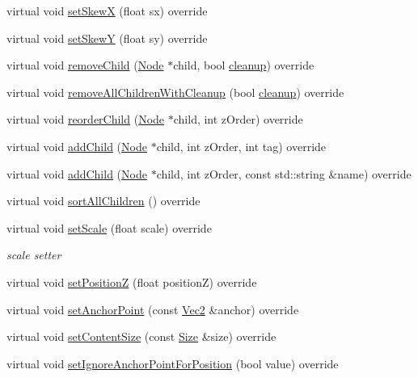 \begin{Indent}
\begin{DoxyCompactItemize}
\item 
virtual void \hyperlink{classSprite_a975b779e48841943ebbe5147331fc8c2}{set\+SkewX} (float sx) override
\item 
virtual void \hyperlink{classSprite_a5472345454102a7682c929b974573879}{set\+SkewY} (float sy) override
\item 
virtual void \hyperlink{classSprite_a84cbb6f523e114e8d5c5767ec7796111}{remove\+Child} (\hyperlink{classNode}{Node} $\ast$child, bool \hyperlink{classNode_aa2de84c6cdeec9cd647d236c30ee0567}{cleanup}) override
\item 
virtual void \hyperlink{classSprite_aaaf5e178d5fd88574b9803fe3fab94fa}{remove\+All\+Children\+With\+Cleanup} (bool \hyperlink{classNode_aa2de84c6cdeec9cd647d236c30ee0567}{cleanup}) override
\item 
virtual void \hyperlink{classSprite_a1b21c65760769e17477ae02ce75adf9f}{reorder\+Child} (\hyperlink{classNode}{Node} $\ast$child, int z\+Order) override
\item 
virtual void \hyperlink{classSprite_af91733127ca0e09dd0a36c78c62ff099}{add\+Child} (\hyperlink{classNode}{Node} $\ast$child, int z\+Order, int tag) override
\item 
virtual void \hyperlink{classSprite_ad1e04b84b4ce5dcebf6c118cdea8565c}{add\+Child} (\hyperlink{classNode}{Node} $\ast$child, int z\+Order, const std\+::string \&name) override
\item 
virtual void \hyperlink{classSprite_ae3553d2d41b7c9fb764fc0ca1b41ef86}{sort\+All\+Children} () override
\item 
virtual void \hyperlink{classSprite_a5a48d940455148277f65a3f6c68f5442}{set\+Scale} (float scale) override
\begin{DoxyCompactList}\small\item\em scale setter \end{DoxyCompactList}\item 
virtual void \hyperlink{classSprite_a3ebbeab90f8e3f136fa9cce2c85ee197}{set\+PositionZ} (float positionZ) override
\item 
virtual void \hyperlink{classSprite_a218c16399fb6c93f2f6dd7b29b54e238}{set\+Anchor\+Point} (const \hyperlink{classVec2}{Vec2} \&anchor) override
\item 
virtual void \hyperlink{classSprite_a040ac797e7c5a3a7ffee7acee8904629}{set\+Content\+Size} (const \hyperlink{classSize}{Size} \&size) override
\item 
virtual void \hyperlink{classSprite_a0466d4642ed98aefe0febeb4a20bb78f}{set\+Ignore\+Anchor\+Point\+For\+Position} (bool value) override

\end{DoxyCompactItemize}
\end{Indent}
